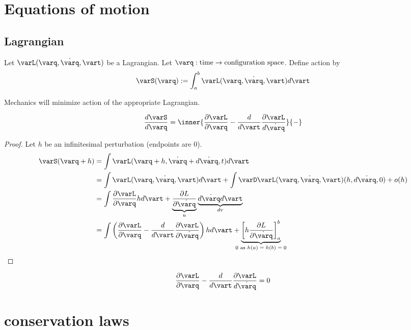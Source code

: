 \documentclass{scrbook}
\numberwithin{thms}{chapter}
\newcommand{\der}{\dot}
\begin{document}
\chapter{Equations of motion}
\section{Lagrangian}
  \newcommand{\q}{\varq}
  \newcommand{\derq}{\der \q}
  \newcommand{\dt}{d\vart}
\begin{defn}[action]
  Let $\varL(\q,\derq, \vart)$ be a Lagrangian.
  Let $\q:\textrm{time}\to\textrm{configuration space}$. 
  Define action by 
  \[
    \varS(\q):=\int_a^b \varL(\q,\derq, \vart) \dt 
  \]
\end{defn}

Mechanics will minimize action of the appropriate Lagrangian.
\begin{theorem}
  \label{th:euler-lagrange}
  \[
    \frac{d\varS}{d\q} = \inner{\frac{\partial \varL}{\partial \q} - \frac{d}{d\vart}\frac{\partial \varL}{d\derq}}{-}
  \]
\end{theorem}
\begin{proof}
  \newcommand{\dq}{h}
  \newcommand{\derdq}{h'}
  Let $\dq$ be an infinitesimal perturbation (endpoints are $0$). 
  \begin{align*}
    \varS(\q+\dq) &= \int \varL(\q+\dq,\derq + d\derq,t)\dt \\
           &= \int \varL(\q,\derq,\vart)\dt + \int \varD\varL(\varq,\derq, \vart)(\dq,d\derq,0) + o(\dq) \\
           &= \int \frac{\partial \varL}{\partial \q} \dq\dt + \underbrace{\frac{\partial L}{\partial \derq}}_{u} \underbrace{d\derq \dt}_{dv} \\
           &=\int\left(\frac{\partial \varL}{\partial \q} - \frac{d}{d\vart} \frac{\partial \varL}{\partial \derq}\right)\dq \dt + \underbrace{\left[\dq\frac{\partial L}{\partial \derq} \right]_a^b}_{\mathclap{0\textrm{ as $\dq(a)=\dq(b)=0$}}}
  \end{align*}
\end{proof}
\begin{cor}
  \[
    \frac{\partial \varL}{\partial \varq} - \frac{d}{d\vart}\frac{\partial \varL}{d\der \varq} = 0
  \]
\end{cor}

\chapter{conservation laws}
\end{document}
